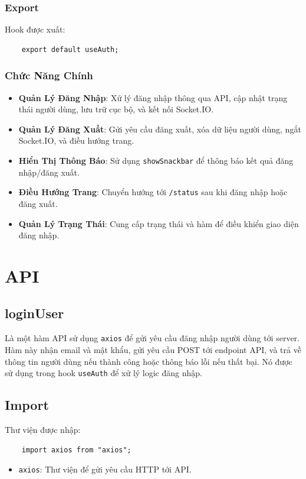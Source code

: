             \subsubsection{Export}
                \hspace*{0.6cm}Hook được xuất:
                \begin{lstlisting}
    export default useAuth;
                \end{lstlisting}

            \subsubsection{Chức Năng Chính}
                \begin{itemize}
                    \item \textbf{Quản Lý Đăng Nhập}: Xử lý đăng nhập thông qua API, cập nhật trạng thái người dùng, lưu trữ cục bộ, và kết nối Socket.IO.
                    \item \textbf{Quản Lý Đăng Xuất}: Gửi yêu cầu đăng xuất, xóa dữ liệu người dùng, ngắt Socket.IO, và điều hướng trang.
                    \item \textbf{Hiển Thị Thông Báo}: Sử dụng \texttt{showSnackbar} để thông báo kết quả đăng nhập/đăng xuất.
                    \item \textbf{Điều Hướng Trang}: Chuyển hướng tới \texttt{/status} sau khi đăng nhập hoặc đăng xuất.
                    \item \textbf{Quản Lý Trạng Thái}: Cung cấp trạng thái và hàm để điều khiển giao diện đăng nhập.
                \end{itemize}
    \section{API}
        \subsection{loginUser}
            \hspace*{0.6cm}Là một hàm API sử dụng \texttt{axios} để gửi yêu cầu đăng nhập người dùng tới server. Hàm này nhận email và mật khẩu, gửi yêu cầu POST tới endpoint API, và trả về thông tin người dùng nếu thành công hoặc thông báo lỗi nếu thất bại. Nó được sử dụng trong hook \texttt{useAuth} để xử lý logic đăng nhập.
            \subsection{Import}
                \hspace*{0.6cm}Thư viện được nhập:
                \begin{lstlisting}
    import axios from "axios";
                \end{lstlisting}
                \begin{itemize}
                    \item \texttt{axios}: Thư viện để gửi yêu cầu HTTP tới API.
                \end{itemize}

